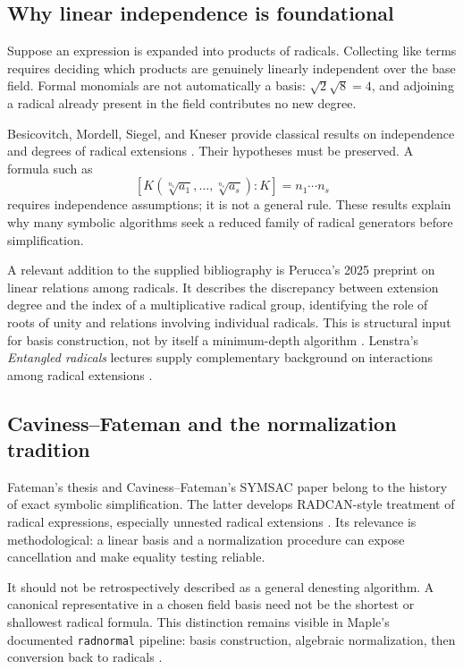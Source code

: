 \documentclass[11pt,a4paper]{article}
\numberwithin{equation}{section}
\theoremstyle{definition}\newtheorem{definition}[theorem]{Definition}
\theoremstyle{remark}\newtheorem{remark}[theorem]{Remark}
\begin{document}
\subsection{Why linear independence is foundational}
Suppose an expression is expanded into products of radicals. Collecting like terms requires deciding which products are genuinely linearly independent over the base field. Formal monomials are not automatically a basis: $\sqrt2\sqrt8=4$, and adjoining a radical already present in the field contributes no new degree.

Besicovitch, Mordell, Siegel, and Kneser provide classical results on independence and degrees of radical extensions \cite{besicovitch,mordell,siegel,kneser}. Their hypotheses must be preserved. A formula such as
\[
[K(\sqrt[n_1]{a_1},\ldots,\sqrt[n_s]{a_s}):K]=n_1\cdots n_s
\]
requires independence assumptions; it is not a general rule. These results explain why many symbolic algorithms seek a reduced family of radical generators before simplification.

A relevant addition to the supplied bibliography is Perucca's 2025 preprint on linear relations among radicals. It describes the discrepancy between extension degree and the index of a multiplicative radical group, identifying the role of roots of unity and relations involving individual radicals. This is structural input for basis construction, not by itself a minimum-depth algorithm \cite{perucca}. Lenstra's \emph{Entangled radicals} lectures supply complementary background on interactions among radical extensions \cite{lenstra06}.

\subsection{Caviness--Fateman and the normalization tradition}
Fateman's thesis and Caviness--Fateman's SYMSAC paper belong to the history of exact symbolic simplification. The latter develops RADCAN-style treatment of radical expressions, especially unnested radical extensions \cite{fateman72,caviness76}. Its relevance is methodological: a linear basis and a normalization procedure can expose cancellation and make equality testing reliable.

It should not be retrospectively described as a general denesting algorithm. A canonical representative in a chosen field basis need not be the shortest or shallowest radical formula. This distinction remains visible in Maple's documented \texttt{radnormal} pipeline: basis construction, algebraic normalization, then conversion back to radicals \cite{maplerad}.
\end{document}
